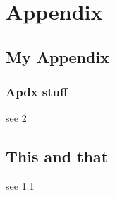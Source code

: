 \appendix
\part*{Appendix}
\chapter{My Appendix}\label{test_apdx}
\section{Apdx stuff}\label{apdx_sec}
see \ref{tat}

\chapter{This and that}\label{tat}
see \ref{apdx_sec}

